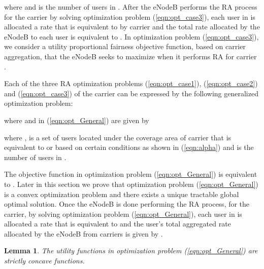 \documentclass[journal]{IEEEtran} 				\IEEEoverridecommandlockouts 						\usepackage{amsmath,amssymb}
\newtheorem{lem}[thm]{Lemma}
\begin{document}
where  and  is the number of users in . After the eNodeB performs the RA process for the  carrier by solving optimization problem (\ref{eqn:opt_case3}), each user in  is allocated a rate that is equivalent to  by carrier  and the total rate allocated by the eNodeB to each user is equivalent to . In optimization problem (\ref{eqn:opt_case3}), we consider a utility proportional fairness objective function, based on carrier aggregation, that the eNodeB seeks to maximize when it performs RA for carrier .


Each of the three RA optimization problems (\ref{eqn:opt_case1}), (\ref{eqn:opt_case2}) and (\ref{eqn:opt_case3}) of the  carrier can be expressed by the following generalized optimization problem:

where  and  in (\ref{eqn:opt_General}) are given by



where ,  is a set of users located under the coverage area of carrier  that is equivalent to  or  based on certain conditions as shown in (\ref{eqn:alpha}) and  is the number of users in .

The objective function in optimization problem (\ref{eqn:opt_General}) is equivalent to . Later in this section we prove that optimization problem (\ref{eqn:opt_General}) is a convex optimization problem and there exists a unique tractable global optimal solution. Once the eNodeB is done performing the RA process, for the  carrier, by solving optimization problem (\ref{eqn:opt_General}), each user in  is allocated a rate that is equivalent to  and the user's total aggregated rate allocated by the eNodeB from carriers  is given by .

\begin{lem}\label{lem:concavity}
The utility functions  in optimization problem (\ref{eqn:opt_General}) are strictly concave functions.
\end{lem}
\end{document}
